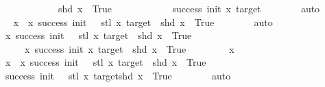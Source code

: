 \begin{isabellebody}
\ \ \ \ \ \ \ \ \ \ \ \ {\isacartoucheopen}shd\ x\ {\isacharequal}{\kern0pt}\ True{\isacartoucheclose}\isanewline
\ \ \ \ \ \ \ \ \ \ \ \ {\isacartoucheopen}success\ init\ x\ target{\isacartoucheclose}\isanewline
\ \ \ \ \ \ \isamarkupfalse%
\ auto\isanewline
\ \ \ \ \isamarkupfalse%
\ \isamarkupfalse%
\ {\isachardoublequoteopen}x\ {\isasymin}\ {\isacharbraceleft}{\kern0pt}x{\isachardot}{\kern0pt}\ success\ {\isacharparenleft}{\kern0pt}init\ {\isacharplus}{\kern0pt}\ {}{\isacharparenright}{\kern0pt}\ {\isacharparenleft}{\kern0pt}stl\ x{\isacharparenright}{\kern0pt}\ target\ {\isasymand}\ shd\ x\ {\isacharequal}{\kern0pt}\ True{\isacharbraceright}{\kern0pt}{\isachardoublequoteclose}\isanewline
\ \ \ \ \ \ \isamarkupfalse%
\ auto\isanewline
\ \ \isamarkupfalse%
\isanewline
{}\isamarkupfalse%
\ \isanewline
\ \ \isamarkupfalse%
\ {\isachardoublequoteopen}{\isacharbraceleft}{\kern0pt}x{\isachardot}{\kern0pt}\ success\ {\isacharparenleft}{\kern0pt}init\ {\isacharplus}{\kern0pt}\ {}{\isacharparenright}{\kern0pt}\ {\isacharparenleft}{\kern0pt}stl\ x{\isacharparenright}{\kern0pt}\ target\ {\isasymand}\ shd\ x\ {\isacharequal}{\kern0pt}\ True{\isacharbraceright}{\kern0pt}\isanewline
\ \ \ \ {\isasymsubseteq}\ {\isacharbraceleft}{\kern0pt}x{\isachardot}{\kern0pt}\ success\ init\ x\ target\ {\isasymand}\ shd\ x\ {\isacharequal}{\kern0pt}\ True{\isacharbraceright}{\kern0pt}{\isachardoublequoteclose}\isanewline
\ \ \isamarkupfalse%
\isanewline
\ \ \ \ \isamarkupfalse%
\ x\isanewline
\ \ \ \ \isamarkupfalse%
\ {\isachardoublequoteopen}x\ {\isasymin}\ {\isacharbraceleft}{\kern0pt}x{\isachardot}{\kern0pt}\ success\ {\isacharparenleft}{\kern0pt}init\ {\isacharplus}{\kern0pt}\ {}{\isacharparenright}{\kern0pt}\ {\isacharparenleft}{\kern0pt}stl\ x{\isacharparenright}{\kern0pt}\ target\ {\isasymand}\ shd\ x\ {\isacharequal}{\kern0pt}\ True{\isacharbraceright}{\kern0pt}{\isachardoublequoteclose}\isanewline
\ \ \ \ \isamarkupfalse%
\ \isamarkupfalse%
\ {\isachardoublequoteopen}success\ {\isacharparenleft}{\kern0pt}init\ {\isacharplus}{\kern0pt}\ {}{\isacharparenright}{\kern0pt}\ {\isacharparenleft}{\kern0pt}stl\ x{\isacharparenright}{\kern0pt}\ target{\isachardoublequoteclose}{\isachardoublequoteopen}shd\ x\ {\isacharequal}{\kern0pt}\ True{\isachardoublequoteclose}\isanewline
\ \ \ \ \ \ \isamarkupfalse%
\ auto\isanewline

\end{isabellebody}
